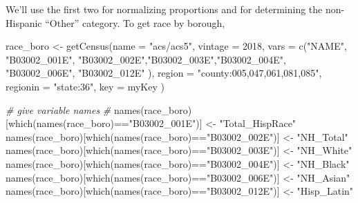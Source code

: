 \documentclass[
  openany]{book}
\newenvironment{Shaded}{\begin{snugshade}}{\end{snugshade}}
\newcommand{\AttributeTok}[1]{\textcolor[rgb]{0.77,0.63,0.00}{#1}}
\newcommand{\CommentTok}[1]{\textcolor[rgb]{0.56,0.35,0.01}{\textit{#1}}}
\newcommand{\DecValTok}[1]{\textcolor[rgb]{0.00,0.00,0.81}{#1}}
\newcommand{\FunctionTok}[1]{\textcolor[rgb]{0.00,0.00,0.00}{#1}}
\newcommand{\NormalTok}[1]{#1}
\newcommand{\OtherTok}[1]{\textcolor[rgb]{0.56,0.35,0.01}{#1}}
\newcommand{\SpecialCharTok}[1]{\textcolor[rgb]{0.00,0.00,0.00}{#1}}
\newcommand{\StringTok}[1]{\textcolor[rgb]{0.31,0.60,0.02}{#1}}
\begin{document}
We'll use the first two for normalizing proportions and for determining the non-Hispanic ``Other'' category. To get race by borough,

\begin{Shaded}
\begin{Highlighting}[]
\NormalTok{race\_boro }\OtherTok{\textless{}{-}} \FunctionTok{getCensus}\NormalTok{(}\AttributeTok{name =} \StringTok{"acs/acs5"}\NormalTok{,}
                       \AttributeTok{vintage =} \DecValTok{2018}\NormalTok{,}
                       \AttributeTok{vars =} \FunctionTok{c}\NormalTok{(}\StringTok{"NAME"}\NormalTok{, }\StringTok{"B03002\_001E"}\NormalTok{,}
                                \StringTok{"B03002\_002E"}\NormalTok{,}\StringTok{"B03002\_003E"}\NormalTok{,}\StringTok{"B03002\_004E"}\NormalTok{, }
                                \StringTok{"B03002\_006E"}\NormalTok{, }\StringTok{"B03002\_012E"}
\NormalTok{                                 ),}
                       \AttributeTok{region =} \StringTok{"county:005,047,061,081,085"}\NormalTok{,}
                       \AttributeTok{regionin =} \StringTok{"state:36"}\NormalTok{, }
                       \AttributeTok{key =}\NormalTok{ myKey}
\NormalTok{                       )}

\CommentTok{\# give variable names}
\CommentTok{\# }
\FunctionTok{names}\NormalTok{(race\_boro)[}\FunctionTok{which}\NormalTok{(}\FunctionTok{names}\NormalTok{(race\_boro)}\SpecialCharTok{==}\StringTok{"B03002\_001E"}\NormalTok{)] }\OtherTok{\textless{}{-}} \StringTok{"Total\_HispRace"}
\FunctionTok{names}\NormalTok{(race\_boro)[}\FunctionTok{which}\NormalTok{(}\FunctionTok{names}\NormalTok{(race\_boro)}\SpecialCharTok{==}\StringTok{"B03002\_002E"}\NormalTok{)] }\OtherTok{\textless{}{-}} \StringTok{"NH\_Total"}
\FunctionTok{names}\NormalTok{(race\_boro)[}\FunctionTok{which}\NormalTok{(}\FunctionTok{names}\NormalTok{(race\_boro)}\SpecialCharTok{==}\StringTok{"B03002\_003E"}\NormalTok{)] }\OtherTok{\textless{}{-}} \StringTok{"NH\_White"}
\FunctionTok{names}\NormalTok{(race\_boro)[}\FunctionTok{which}\NormalTok{(}\FunctionTok{names}\NormalTok{(race\_boro)}\SpecialCharTok{==}\StringTok{"B03002\_004E"}\NormalTok{)] }\OtherTok{\textless{}{-}} \StringTok{"NH\_Black"}
\FunctionTok{names}\NormalTok{(race\_boro)[}\FunctionTok{which}\NormalTok{(}\FunctionTok{names}\NormalTok{(race\_boro)}\SpecialCharTok{==}\StringTok{"B03002\_006E"}\NormalTok{)] }\OtherTok{\textless{}{-}} \StringTok{"NH\_Asian"}
\FunctionTok{names}\NormalTok{(race\_boro)[}\FunctionTok{which}\NormalTok{(}\FunctionTok{names}\NormalTok{(race\_boro)}\SpecialCharTok{==}\StringTok{"B03002\_012E"}\NormalTok{)] }\OtherTok{\textless{}{-}} \StringTok{"Hisp\_Latin"}


\end{Highlighting}
\end{Shaded}
\end{document}
